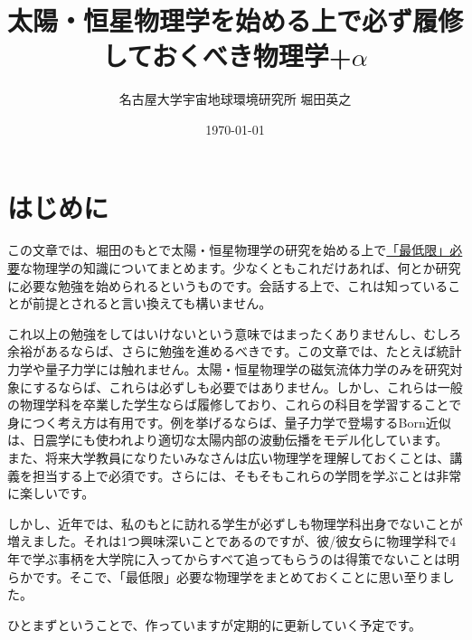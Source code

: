 \documentclass{ltjarticle}
\title{太陽・恒星物理学を始める上で必ず履修しておくべき物理学+$\alpha$}
\author{名古屋大学宇宙地球環境研究所 堀田英之}
\date{\today}
\begin{document}
\maketitle
\tableofcontents
\clearpage
\section{はじめに}
この文章では、堀田のもとで太陽・恒星物理学の研究を始める上で\underline{「最低限」必要}な物理学の知識についてまとめます。少なくともこれだけあれば、何とか研究に必要な勉強を始められるというものです。会話する上で、これは知っていることが前提とされると言い換えても構いません。\par
これ以上の勉強をしてはいけないという意味ではまったくありませんし、むしろ余裕があるならば、さらに勉強を進めるべきです。この文章では、たとえば統計力学や量子力学には触れません。太陽・恒星物理学の磁気流体力学のみを研究対象にするならば、これらは必ずしも必要ではありません。しかし、これらは一般の物理学科を卒業した学生ならば履修しており、これらの科目を学習することで身につく考え方は有用です。例を挙げるならば、量子力学で登場するBorn近似は、日震学にも使われより適切な太陽内部の波動伝播をモデル化しています。
また、将来大学教員になりたいみなさんは広い物理学を理解しておくことは、講義を担当する上で必須です。さらには、そもそもこれらの学問を学ぶことは非常に楽しいです。
\par
しかし、近年では、私のもとに訪れる学生が必ずしも物理学科出身でないことが増えました。それは1つ興味深いことであるのですが、彼/彼女らに物理学科で4年で学ぶ事柄を大学院に入ってからすべて追ってもらうのは得策でないことは明らかです。そこで、「最低限」必要な物理学をまとめておくことに思い至りました。
\par
ひとまずということで、作っていますが定期的に更新していく予定です。
\end{document}
